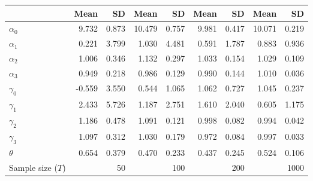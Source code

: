 
\begin{tabular}[t]{lrrrrrrrr}
\toprule
  & Mean & SD & Mean  & SD  & Mean   & SD   & Mean    & SD   \\
\midrule
$\alpha_{0}$ & 9.732 & 0.873 & 10.479 & 0.757 & 9.981 & 0.417 & 10.071 & 0.219\\
$\alpha_{1}$ & 0.221 & 3.799 & 1.030 & 4.481 & 0.591 & 1.787 & 0.883 & 0.936\\
$\alpha_{2}$ & 1.006 & 0.346 & 1.132 & 0.297 & 1.033 & 0.154 & 1.029 & 0.109\\
$\alpha_{3}$ & 0.949 & 0.218 & 0.986 & 0.129 & 0.990 & 0.144 & 1.010 & 0.036\\
$\gamma_{0}$ & -0.559 & 3.550 & 0.544 & 1.065 & 1.062 & 0.727 & 1.045 & 0.237\\
$\gamma_{1}$ & 2.433 & 5.726 & 1.187 & 2.751 & 1.610 & 2.040 & 0.605 & 1.175\\
$\gamma_{2}$ & 1.186 & 0.478 & 1.091 & 0.121 & 0.998 & 0.082 & 0.994 & 0.042\\
$\gamma_{3}$ & 1.097 & 0.312 & 1.030 & 0.179 & 0.972 & 0.084 & 0.997 & 0.033\\
$\theta$ & 0.654 & 0.379 & 0.470 & 0.233 & 0.437 & 0.245 & 0.524 & 0.106\\
Sample size ($T$) &  & 50 &  & 100 &  & 200 &  & 1000\\
\bottomrule
\end{tabular}
